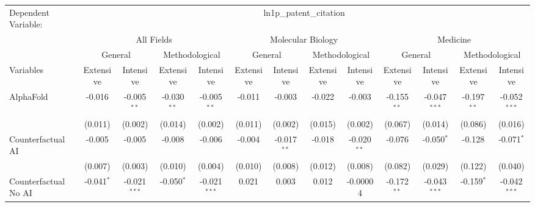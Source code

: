 \begingroup
\centering
\begin{tabular}{lcccccccccccc}
   \tabularnewline \midrule \midrule
   Dependent Variable: & \multicolumn{12}{c}{ln1p\_patent\_citation}\\
 & \multicolumn{4}{c}{All Fields} & \multicolumn{4}{c}{Molecular Biology} & \multicolumn{4}{c}{Medicine} \\
\cmidrule(lr){2-5} \cmidrule(lr){6-9} \cmidrule(lr){10-13}
 & \multicolumn{2}{c}{General} & \multicolumn{2}{c}{Methodological} & \multicolumn{2}{c}{General} & \multicolumn{2}{c}{Methodological} & \multicolumn{2}{c}{General} & \multicolumn{2}{c}{Methodological} \\
\cmidrule(lr){2-3} \cmidrule(lr){4-5} \cmidrule(lr){6-7} \cmidrule(lr){8-9} \cmidrule(lr){10-11} \cmidrule(lr){12-13}
Variables & \multicolumn{1}{c}{Extensive} & \multicolumn{1}{c}{Intensive} & \multicolumn{1}{c}{Extensive} & \multicolumn{1}{c}{Intensive} & \multicolumn{1}{c}{Extensive} & \multicolumn{1}{c}{Intensive} & \multicolumn{1}{c}{Extensive} & \multicolumn{1}{c}{Intensive} & \multicolumn{1}{c}{Extensive} & \multicolumn{1}{c}{Intensive} & \multicolumn{1}{c}{Extensive} & \multicolumn{1}{c}{Intensive} \\
\cmidrule(lr){1-1}\cmidrule(lr){2-2} \cmidrule(lr){3-3} \cmidrule(lr){4-4} \cmidrule(lr){5-5} \cmidrule(lr){6-6} \cmidrule(lr){7-7} \cmidrule(lr){8-8} \cmidrule(lr){9-9} \cmidrule(lr){10-10} \cmidrule(lr){11-11} \cmidrule(lr){12-12} \cmidrule(lr){13-13}
   AlphaFold                                & -0.016        & -0.005$^{**}$  & -0.030$^{**}$ & -0.005$^{**}$  & -0.011  & -0.003        & -0.022  & -0.003        & -0.155$^{**}$ & -0.047$^{***}$ & -0.197$^{**}$ & -0.052$^{***}$\\   
                                            & (0.011)       & (0.002)        & (0.014)       & (0.002)        & (0.011) & (0.002)       & (0.015) & (0.002)       & (0.067)       & (0.014)        & (0.086)       & (0.016)\\   
   Counterfactual AI                        & -0.005        & -0.005         & -0.008        & -0.006         & -0.004  & -0.017$^{**}$ & -0.018  & -0.020$^{**}$ & -0.076        & -0.050$^{*}$   & -0.128        & -0.071$^{*}$\\   
                                            & (0.007)       & (0.003)        & (0.010)       & (0.004)        & (0.010) & (0.008)       & (0.012) & (0.008)       & (0.082)       & (0.029)        & (0.122)       & (0.040)\\   
   Counterfactual No AI                     & -0.041$^{*}$  & -0.021$^{***}$ & -0.050$^{*}$  & -0.021$^{***}$ & 0.021   & 0.003         & 0.012   & -0.00004      & -0.172$^{**}$ & -0.043$^{***}$ & -0.159$^{*}$  & -0.042$^{***}$\\   

\end{tabular}
